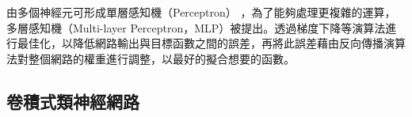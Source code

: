 由多個神經元可形成單層感知機（Perceptron） \cite{rosenblatt1958perceptron}，為了能夠處理更複雜的運算，多層感知機（Multi-layer Perceptron，MLP）被提出。透過梯度下降等演算法進行最佳化，以降低網路輸出與目標函數之間的誤差，再將此誤差藉由反向傳播演算法對整個網路的權重進行調整，以最好的擬合想要的函數。

\subsection{卷積式類神經網路}

 